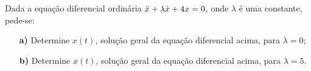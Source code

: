 \linespread{1.5}
Dada a equação diferencial ordinária $\Ddot{x} + \lambda\dot{x} + 4x = 0$, onde $\lambda$ é uma constante, pede-se:
\begin{itemize}
    \item[\textbf{a)}] Determine $x(t)$, solução geral da equação diferencial acima, para $\lambda = 0$;
    \item[\textbf{b)}] Determine $x(t)$, solução geral da equação diferencial acima, para $\lambda = 5$.
\end{itemize}